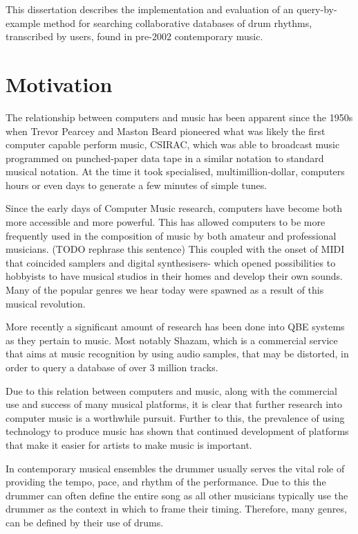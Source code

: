 \documentclass[12pt,twoside,notitlepage]{report}
\begin{document}
	This dissertation describes the implementation and evaluation of an query-by-example method for searching collaborative databases of drum rhythms, transcribed by users, found in pre-2002 contemporary music.
	
	\section{\label{sec:Motivation}Motivation}
	The relationship between computers and music has been apparent since the 1950s when Trevor Pearcey and Maston Beard pioneered what was likely the first computer capable perform music, CSIRAC\footnotemark {}, which was able to broadcast music programmed on punched-paper data tape in a similar notation to standard musical notation\cite{CSIRAC}. At the time it took specialised, multimillion-dollar, computers hours or even days to generate a few minutes of simple tunes\cite{Mathews1963}.
	
	Since the early days of Computer Music research, computers have become both more accessible and more powerful. This has allowed computers to be more frequently used in the composition of music by both amateur and professional musicians. (TODO rephrase this sentence) This coupled with the onset of MIDI\footnotemark {} that coincided samplers and digital synthesisers- which opened possibilities to hobbyists to have musical studios in their homes and develop their own sounds. Many of the popular genres we hear today were spawned as a result of this musical revolution.
	
	More recently a significant amount of research has been done into QBE\footnotemark {} systems as they pertain to music. Most notably Shazam\cite{Shazam}, which is a commercial service that aims at music recognition by using audio samples, that may be distorted, in order to query a database of over 3 million tracks.
	
	Due to this relation between computers and music, along with the commercial use and success of many musical platforms, it is clear that further research into computer music is a worthwhile pursuit. Further to this, the prevalence of using technology to produce music has shown that continued development of platforms that make it easier for artists to make music is important.
	
	In contemporary musical ensembles the drummer usually serves the vital role of providing the tempo, pace, and rhythm of the performance. Due to this the drummer can often define the entire song as all other musicians typically use the drummer as the context in which to frame their timing. Therefore, many genres, can be defined by their use of drums.
	
\end{document}
